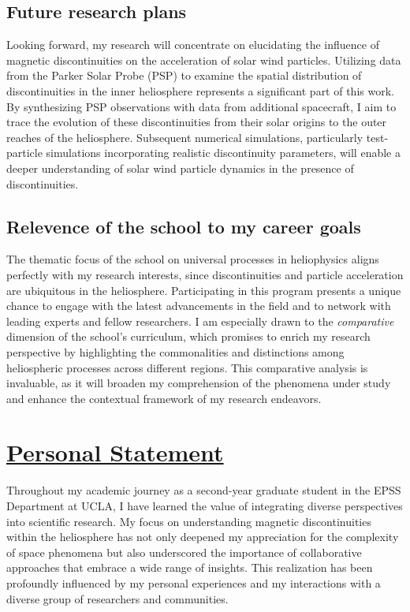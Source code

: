 \documentclass[
  letterpaper,
  DIV=11,
  numbers=noendperiod]{scrartcl}
\begin{document}
\subsection{Future research plans}\label{future-research-plans}

Looking forward, my research will concentrate on elucidating the
influence of magnetic discontinuities on the acceleration of solar wind
particles. Utilizing data from the Parker Solar Probe (PSP) to examine
the spatial distribution of discontinuities in the inner heliosphere
represents a significant part of this work. By synthesizing PSP
observations with data from additional spacecraft, I aim to trace the
evolution of these discontinuities from their solar origins to the outer
reaches of the heliosphere. Subsequent numerical simulations,
particularly test-particle simulations incorporating realistic
discontinuity parameters, will enable a deeper understanding of solar
wind particle dynamics in the presence of discontinuities.

\subsection{Relevence of the school to my career
goals}\label{relevence-of-the-school-to-my-career-goals}

The thematic focus of the school on universal processes in heliophysics
aligns perfectly with my research interests, since discontinuities and
particle acceleration are ubiquitous in the heliosphere. Participating
in this program presents a unique chance to engage with the latest
advancements in the field and to network with leading experts and fellow
researchers. I am especially drawn to the \emph{comparative} dimension
of the school's curriculum, which promises to enrich my research
perspective by highlighting the commonalities and distinctions among
heliospheric processes across different regions. This comparative
analysis is invaluable, as it will broaden my comprehension of the
phenomena under study and enhance the contextual framework of my
research endeavors.

\newpage{}

\section{\texorpdfstring{\ul{Personal
Statement}}{Personal Statement}}\label{personal-statement}

Throughout my academic journey as a second-year graduate student in the
EPSS Department at UCLA, I have learned the value of integrating diverse
perspectives into scientific research. My focus on understanding
magnetic discontinuities within the heliosphere has not only deepened my
appreciation for the complexity of space phenomena but also underscored
the importance of collaborative approaches that embrace a wide range of
insights. This realization has been profoundly influenced by my personal
experiences and my interactions with a diverse group of researchers and
communities.
\end{document}
